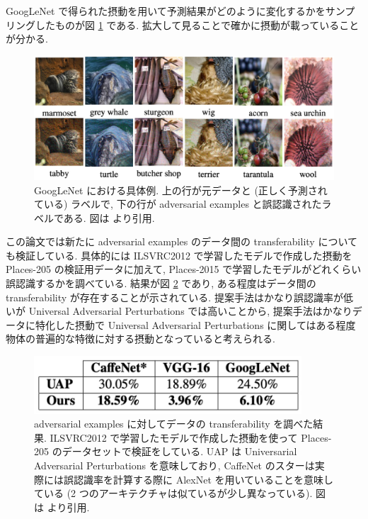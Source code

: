 GoogLeNet で得られた摂動を用いて予測結果がどのように変化するかをサンプリングしたものが図 \ref{fig:fast-feature-examples} である.
拡大して見ることで確かに摂動が載っていることが分かる.
%
\begin{figure}[htbp]
\begin{center}
\includegraphics[width=14.0cm]{figures/fast-feature-examples.pdf}
\end{center}
\caption{
GoogLeNet における具体例.
上の行が元データと (正しく予測されている) ラベルで, 下の行が adversarial examples と誤認識されたラベルである.
図は \cite{mopuri2017fast} より引用.
}
\label{fig:fast-feature-examples}
\end{figure}
%

この論文では新たに adversarial examples のデータ間の transferability についても検証している.
具体的には ILSVRC2012 で学習したモデルで作成した摂動を Places-205 \cite{zhou2016places} の検証用データに加えて, Places-2015 で学習したモデルがどれくらい誤認識するかを調べている.
結果が図 \ref{fig:fast-feature-data-transferability} であり, ある程度はデータ間の transferability が存在することが示されている.
提案手法はかなり誤認識率が低いが Universal Adversarial Perturbations では高いことから, 提案手法はかなりデータに特化した摂動で Universal Adversarial Perturbations に関してはある程度物体の普遍的な特徴に対する摂動となっていると考えられる.
%
\begin{figure}[htbp]
\begin{center}
\includegraphics[width=10.0cm]{figures/fast-feature-data-transferability.pdf}
\end{center}
\caption{
adversarial examples に対してデータの transferability を調べた結果.
ILSVRC2012 で学習したモデルで作成した摂動を使って Places-205 のデータセットで検証をしている.
UAP は Universarial Adversarial Perturbations を意味しており, CaffeNet のスターは実際には誤認識率を計算する際に AlexNet を用いていることを意味している (2 つのアーキテクチャは似ているが少し異なっている).
図は \cite{mopuri2017fast} より引用.
}
\label{fig:fast-feature-data-transferability}
\end{figure}
%

